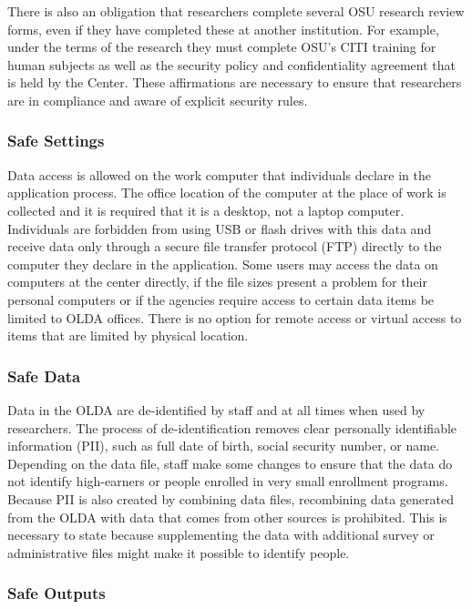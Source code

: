 \documentclass[
]{WileySix}
\begin{document}
There is also an obligation that researchers complete several OSU research review forms, even if they have completed these at another institution. For example, under the terms of the research they must complete OSU's CITI training for human subjects as well as the security policy and confidentiality agreement that is held by the Center. These affirmations are necessary to ensure that researchers are in compliance and aware of explicit security rules.

\hypertarget{safe-settings-1}{%
\subsubsection{Safe Settings}\label{safe-settings-1}}

Data access is allowed on the work computer that individuals declare in the application process. The office location of the computer at the place of work is collected and it is required that it is a desktop, not a laptop computer. Individuals are forbidden from using USB or flash drives with this data and receive data only through a secure file transfer protocol (FTP) directly to the computer they declare in the application. Some users may access the data on computers at the center directly, if the file sizes present a problem for their personal computers or if the agencies require access to certain data items be limited to OLDA offices. There is no option for remote access or virtual access to items that are limited by physical location.

\hypertarget{safe-data-1}{%
\subsubsection{Safe Data}\label{safe-data-1}}

Data in the OLDA are de-identified by staff and at all times when used by researchers. The process of de-identification removes clear personally identifiable information (PII), such as full date of birth, social security number, or name. Depending on the data file, staff make some changes to ensure that the data do not identify high-earners or people enrolled in very small enrollment programs. Because PII is also created by combining data files, recombining data generated from the OLDA with data that comes from other sources is prohibited. This is necessary to state because supplementing the data with additional survey or administrative files might make it possible to identify people.

\hypertarget{safe-outputs-1}{%
\subsubsection{Safe Outputs}\label{safe-outputs-1}}
\end{document}
